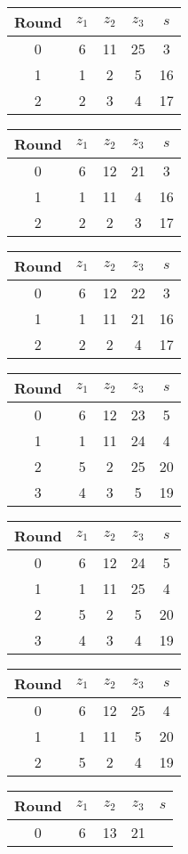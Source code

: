 \begin{tabular}{c | c | c | c | c }
Round & $z_1$ & $z_2$ & $z_3$ & $s$ \\
\hline
0 & 6 & 11 & 25 & 3 \\
1 & 1 & 2 & 5 & 16 \\
2 & 2 & 3 & 4 & 17
\end{tabular}

\begin{tabular}{c | c | c | c | c }
Round & $z_1$ & $z_2$ & $z_3$ & $s$ \\
\hline
0 & 6 & 12 & 21 & 3 \\
1 & 1 & 11 & 4 & 16 \\
2 & 2 & 2 & 3 & 17
\end{tabular}

\begin{tabular}{c | c | c | c | c }
Round & $z_1$ & $z_2$ & $z_3$ & $s$ \\
\hline
0 & 6 & 12 & 22 & 3 \\
1 & 1 & 11 & 21 & 16 \\
2 & 2 & 2 & 4 & 17
\end{tabular}

\begin{tabular}{c | c | c | c | c }
Round & $z_1$ & $z_2$ & $z_3$ & $s$ \\
\hline
0 & 6 & 12 & 23 & 5 \\
1 & 1 & 11 & 24 & 4 \\
2 & 5 & 2 & 25 & 20 \\
3 & 4 & 3 & 5 & 19
\end{tabular}

\begin{tabular}{c | c | c | c | c }
Round & $z_1$ & $z_2$ & $z_3$ & $s$ \\
\hline
0 & 6 & 12 & 24 & 5 \\
1 & 1 & 11 & 25 & 4 \\
2 & 5 & 2 & 5 & 20 \\
3 & 4 & 3 & 4 & 19
\end{tabular}

\begin{tabular}{c | c | c | c | c }
Round & $z_1$ & $z_2$ & $z_3$ & $s$ \\
\hline
0 & 6 & 12 & 25 & 4 \\
1 & 1 & 11 & 5 & 20 \\
2 & 5 & 2 & 4 & 19
\end{tabular}

\begin{tabular}{c | c | c | c | c }
Round & $z_1$ & $z_2$ & $z_3$ & $s$ \\
\hline
0 & 6 & 13 & 21 &
\end{tabular}
